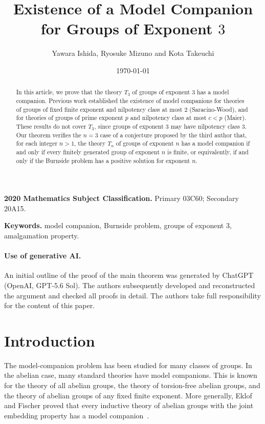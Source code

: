 \documentclass[11pt,reqno]{article}
\title{Existence of a Model Companion for Groups of Exponent $3$}
\author{Yawara Ishida, Ryosuke Mizuno and Kota Takeuchi}
\date{\today}
\theoremstyle{definition}
\theoremstyle{remark}
\begin{document}
\maketitle

\begin{abstract}
In this article, we prove that the theory $T_3$ of groups of exponent $3$ has a model
companion. Previous work established the existence of model companions
for theories of groups of fixed finite exponent and nilpotency class
at most $2$ (Saracino-Wood), and for theories of groups of prime exponent $p$ and
nilpotency class at most $c<p$ (Maier). These results do not cover $T_3$,
since groups of exponent $3$ may have nilpotency class $3$.
Our theorem verifies the $n=3$ case of a conjecture proposed by the third author that,
for each integer $n>1$, the theory $T_n$ of groups of exponent $n$
has a model companion if and only if every finitely generated group
of exponent $n$ is finite, or equivalently, if and only if the
Burnside problem has a positive solution for exponent $n$.
\end{abstract}

\medskip
\noindent\textbf{2020 Mathematics Subject Classification.}
Primary 03C60; Secondary 20A15.

\smallskip
\noindent\textbf{Keywords.}
model companion, Burnside problem, groups of exponent $3$, amalgamation property.

\paragraph{Use of generative AI.}
An initial outline of the proof of the main theorem was generated by ChatGPT (OpenAI, GPT-5.6 Sol).
The authors subsequently developed and reconstructed the argument
and checked all proofs in detail.
The authors take full responsibility for the content of this paper.

\section{Introduction}
\label{sec:introduction}

The model-companion problem has been studied for many classes of groups.
In the abelian case, many standard theories have model companions.
This is known for the theory of all abelian groups, the theory of torsion-free abelian groups, and the theory of abelian groups of any fixed finite exponent.
More generally, Eklof and Fischer proved that every inductive theory of abelian groups with the joint embedding property has a model companion~\cite{EklofFischer1972}.
\end{document}
